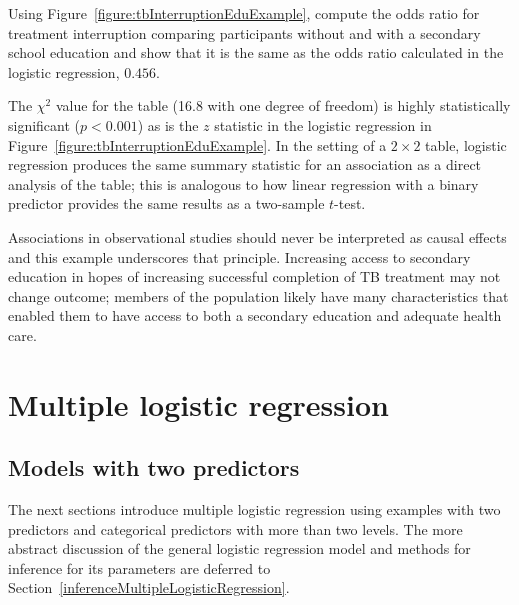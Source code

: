 \begin{exercisewrap}
  \begin{nexercise}
    Using Figure~\ref{figure:tbInterruptionEduExample}, compute the odds ratio for treatment interruption comparing participants without and with a secondary school education and show that it is the same as the odds ratio calculated in the logistic regression, $0.456$.
    \footnotemark{}
  \end{nexercise}
\end{exercisewrap}

The $\chi^2$ value for the table (16.8 with one degree of freedom) is highly statistically significant ($p < 0.001$) as is the $z$ statistic in the logistic regression in Figure~\ref{figure:tbInterruptionEduExample}. In the setting of a $2 \times 2$ table, logistic regression produces the same summary statistic for an association as a direct analysis of the table; this is analogous to how linear regression with a binary predictor provides the same results as a two-sample $t$-test.

Associations in observational studies should never be interpreted as causal effects and this example underscores that principle.  Increasing access to secondary education in hopes of increasing successful completion of TB treatment may not change outcome; members of the population likely have many characteristics that enabled them to have access to both a secondary education and adequate health care.


\section{Multiple logistic regression}
\label{generalMultipleLogistic}

\subsection{Models with two predictors}
\label{section:modelsWithTwoPredictors}

The next sections introduce multiple logistic regression using examples with two predictors and categorical predictors with more than two levels.  The more abstract discussion of the general logistic regression model and methods for inference for its parameters are deferred to Section~\ref{inferenceMultipleLogisticRegression}.

